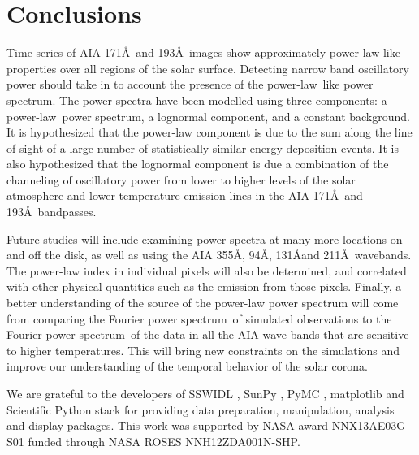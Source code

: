 \documentclass{aastex}
\newcommand{\PS}{power spectrum}
\newcommand{\PL}{power-law}
\newcommand{\Fps}{Fourier \PS}
\begin{document}
\section{Conclusions}\label{sec:conc}

Time series of AIA 171\AA\ and 193\AA\ images show approximately power
law like properties over all regions of the solar surface.  Detecting
narrow band oscillatory power should take in to account the presence
of the \PL\ like \PS.  The power spectra have been modelled using
three components: a \PL\ \PS, a lognormal component, and a constant
background.  It is hypothesized that the power-law component is due to
the sum along the line of sight of a large number of statistically
similar energy deposition events.  It is also hypothesized that the
lognormal component is due a combination of the channeling of
oscillatory power from lower to higher levels of the solar atmosphere
and lower temperature emission lines in the AIA 171\AA\ and
193\AA\ bandpasses.

Future studies will include examining power spectra at many more
locations on and off the disk, as well as using the AIA 355\AA, 94\AA,
131\AA and 211\AA\ wavebands.  The power-law index in individual
pixels will also be determined, and correlated with other physical
quantities such as the emission from those pixels.  Finally, a better
understanding of the source of the power-law power spectrum will come
from comparing the \Fps\ of simulated observations to the \Fps\ of the
data in all the AIA wave-bands that are sensitive to higher
temperatures.  This will bring new constraints on the simulations and
improve our understanding of the temporal behavior of the solar
corona.




\acknowledgments

We are grateful to the developers of SSWIDL
\citep{1998SoPh..182..497F}, SunPy \citep{mumford-proc-scipy-2013},
PyMC \citep{Patil:Huard:Fonnesbeck:2010:JSSOBK:v35i04}, matplotlib
\citep{Hunter:2007} and Scientific Python stack for providing data
preparation, manipulation, analysis and display packages.  This work
was supported by NASA award NNX13AE03G S01 funded through NASA ROSES
NNH12ZDA001N-SHP.
\end{document}
